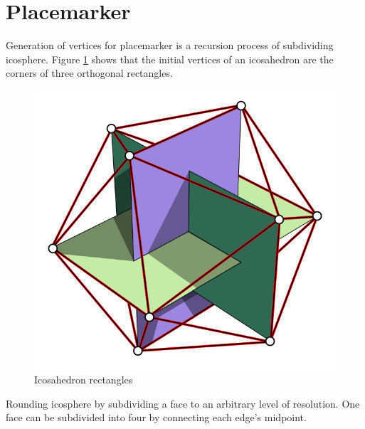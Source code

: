\section{Placemarker}

Generation of vertices for placemarker is a recursion process of subdividing icosphere. Figure \ref{fig:icosahedron-rectangles} shows that the initial vertices of an icosahedron are the corners of three orthogonal rectangles.

\begin{figure}[H]
\caption[icosahedron-rectangles]{Icosahedron rectangles \parencite{wiki.icosahedron-rectangles.2006}}
\label{fig:icosahedron-rectangles}
\centering
\includegraphics[width=\linewidth]{Figures/icosahedron-rectangles.png}
\decoRule
\end{figure}

Rounding icosphere by subdividing a face to an arbitrary level of resolution. One face can be subdivided into four by connecting each edge's midpoint.

